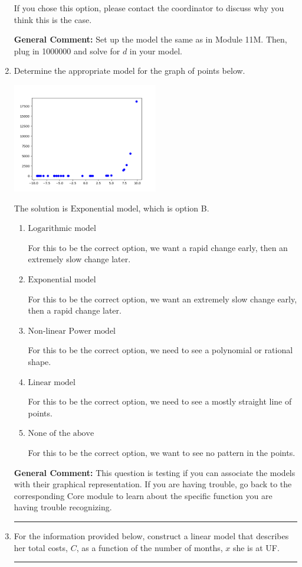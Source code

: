 \documentclass{extbook}[14pt]
\newcommand{\litem}[1]{\item #1

\rule{\textwidth}{0.4pt}}
\begin{document}
\begin{enumerate}
{\begin{enumerate}[label=\Alph*.]
If you chose this option, please contact the coordinator to discuss why you think this is the case.
\end{enumerate}

\textbf{General Comment:} Set up the model the same as in Module 11M. Then, plug in 1000000 and solve for $d$ in your model.
}
\litem{
Determine the appropriate model for the graph of points below.

\begin{center}
    \includegraphics[width=0.5\textwidth]{../Figures/identifyModelGraph12A.png}
\end{center}


The solution is \( \text{Exponential model} \), which is option B.\begin{enumerate}[label=\Alph*.]
\item \( \text{Logarithmic model} \)

For this to be the correct option, we want a rapid change early, then an extremely slow change later.
\item \( \text{Exponential model} \)

For this to be the correct option, we want an extremely slow change early, then a rapid change later.
\item \( \text{Non-linear Power model} \)

For this to be the correct option, we need to see a polynomial or rational shape.
\item \( \text{Linear model} \)

For this to be the correct option, we need to see a mostly straight line of points.
\item \( \text{None of the above} \)

For this to be the correct option, we want to see no pattern in the points.
\end{enumerate}

\textbf{General Comment:} This question is testing if you can associate the models with their graphical representation. If you are having trouble, go back to the corresponding Core module to learn about the specific function you are having trouble recognizing.
}
\litem{
For the information provided below, construct a linear model that describes her total costs, $C$, as a function of the number of months, $x$ she is at UF. 

}
\end{enumerate}
\end{document}

